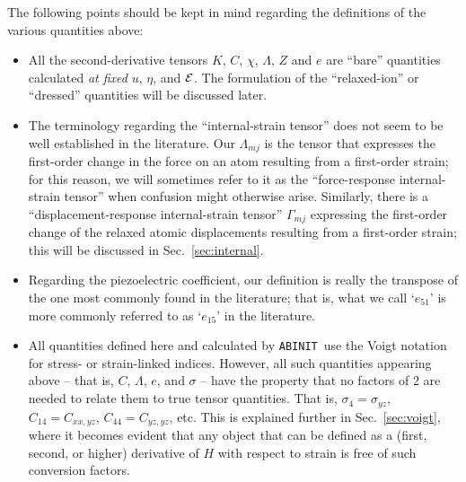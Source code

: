 \documentclass[11pt,fleqn]{article}
\def\E{{\cal E}}
\def\ABINIT{{{\tt ABINIT}}}
\begin{document}
The following points should be kept in mind regarding the definitions
of the various quantities above:

\begin{itemize}

\item
All the second-derivative tensors $K$, $C$, $\chi$,
$\Lambda$, $Z$ and $e$ are ``bare'' quantities calculated
{\it at fixed} $u$, $\eta$, and $\E$.  The formulation of the
``relaxed-ion'' or ``dressed'' quantities will be discussed
later.

\item
The terminology regarding the ``internal-strain tensor''
does not seem to be well established in the literature.
Our $\Lambda_{mj}$ is the tensor that expresses the first-order change in
the force on an atom resulting from a first-order strain; for this
reason, we will sometimes refer to it as the ``force-response
internal-strain tensor'' when confusion might otherwise arise.
Similarly, there is a ``displacement-response internal-strain
tensor'' $\Gamma_{mj}$ expressing the first-order change of the
relaxed atomic displacements resulting from a first-order strain;
this will be discussed in Sec.~\ref{sec:internal}.

\item
Regarding the piezoelectric coefficient, our definition is really the
transpose of the one most commonly found in the literature; that is,
what we call `$e_{51}$' is more commonly referred to as `$e_{15}$'
in the literature.

\item
All quantities defined
here and calculated by \ABINIT\ use the Voigt notation for stress-
or strain-linked indices.  However, all such quantities appearing
above -- that is, $C$, $\Lambda$, $e$, and $\sigma$ -- have the
property that no factors of 2 are needed to relate them to true
tensor quantities.  That is, $\sigma_4=\sigma_{yz}$,
$C_{14}=C_{xx,yz}$, $C_{44}=C_{yz,yz}$, etc.  This is explained
further in Sec.~\ref{sec:voigt}, where it becomes evident that
any object that can be defined as a (first, second, or higher)
derivative of $H$ with respect to strain is free of such
conversion factors.

\end{itemize}
\end{document}
